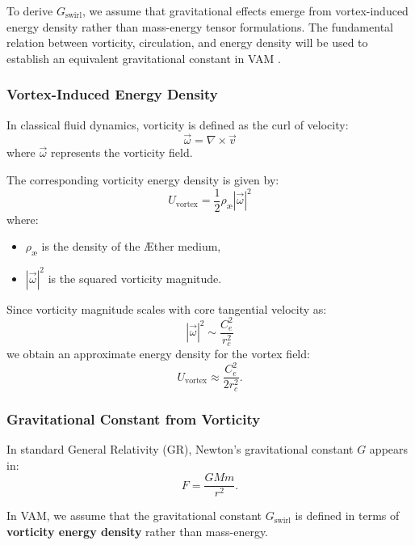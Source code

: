 \documentclass[a4paper,10pt]{article}
\begin{document}
To derive \(  G_\text{swirl} \), we assume that gravitational effects emerge from vortex-induced energy density rather than mass-energy tensor formulations. The fundamental relation between vorticity, circulation, and energy density will be used to establish an equivalent gravitational constant in VAM \cite{onsager_superfluid, barcelo_superfluid, moffatt_helicity}.

\subsubsection*{Vortex-Induced Energy Density}
In classical fluid dynamics, vorticity is defined as the curl of velocity:
\begin{equation*}
    \vec{\omega} = \nabla \times \vec{v}
\end{equation*}
where \( \vec{\omega} \) represents the vorticity field.

The corresponding vorticity energy density is given by:
\begin{equation*}
    U_\text{vortex} = \frac{1}{2} \rho_\text{\ae} |\vec{\omega}|^2
\end{equation*}
where:
\begin{itemize}
    \item \( \rho_\text{\ae} \) is the density of the Æther medium,
    \item \( |\vec{\omega}|^2 \) is the squared vorticity magnitude.
\end{itemize}

Since vorticity magnitude scales with core tangential velocity as:
\begin{equation*}
    |\vec{\omega}|^2 \sim \frac{C_e^2}{r_c^2}
\end{equation*}
we obtain an approximate energy density for the vortex field:
\begin{equation*}
    U_\text{vortex} \approx \frac{C_e^2}{2 r_c^2}.
\end{equation*}

\subsubsection*{Gravitational Constant from Vorticity}
In standard General Relativity (GR), Newton's gravitational constant \( G \) appears in:
\begin{equation*}
    F = \frac{GMm}{r^2}.
\end{equation*}

In VAM, we assume that the gravitational constant \(  G_\text{swirl} \) is defined in terms of \textbf{vorticity energy density} rather than mass-energy.
\end{document}
